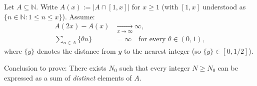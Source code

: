 Let $A\subseteq \mathbb{N}$. Write $A(x):=\left|A\cap[1,x]\right|$ for $x\ge 1$ (with $[1,x]$ understood as $\{n\in\mathbb{N}:1\le n\le x\}$).
Assume:
\begin{align}
A(2x)-A(x) &\xrightarrow[x\to\infty]{} \infty,\label{eq:dyadic_growth}\\
\sum_{n\in A} \{\theta n\} &= \infty\quad\text{for every }\theta\in(0,1),\label{eq:theta_div}
\end{align}
where $\{y\}$ denotes the distance from $y$ to the nearest integer (so $\{y\}\in[0,1/2]$).

Conclusion to prove:
There exists $N_0$ such that every integer $N\ge N_0$ can be expressed as a sum of \emph{distinct} elements of $A$.
